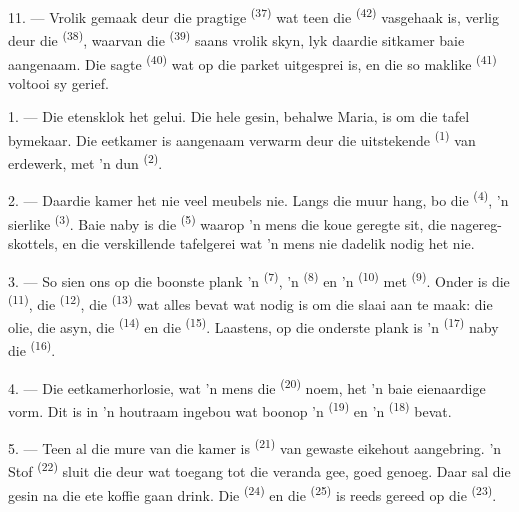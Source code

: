 11. --- Vrolik gemaak deur die pragtige  \textsuperscript{(37)} wat
teen die  \textsuperscript{(42)} vasgehaak is, verlig deur die
 \textsuperscript{(38)}, waarvan die  \textsuperscript{(39)} saans vrolik skyn, lyk daardie sitkamer baie aangenaam. Die
sagte  \textsuperscript{(40)} wat op die parket uitgesprei is, en die so
maklike  \textsuperscript{(41)} voltooi sy gerief.

\VUsaut{3.6mm}
\VUsaut{3.0mm}

1. --- Die etensklok het gelui. Die hele gesin, behalwe Maria, is om die tafel
bymekaar. Die eetkamer is aangenaam verwarm deur die uitstekende 
\textsuperscript{(1)} van erdewerk, met 'n dun  \textsuperscript{(2)}.

2. --- Daardie kamer het nie veel meubels nie. Langs die muur hang, bo die
 \textsuperscript{(4)}, 'n sierlike 
\textsuperscript{(3)}. Baie naby is die  \textsuperscript{(5)} waarop 'n
mens die koue geregte sit, die nagereg-skottels, en die verskillende tafelgerei wat 'n
mens nie dadelik nodig het nie.

3. --- So sien ons op die boonste plank 'n 
\textsuperscript{(7)}, 'n  \textsuperscript{(8)} en 'n 
\textsuperscript{(10)} met  \textsuperscript{(9)}. Onder is die
 \textsuperscript{(11)}, die  \textsuperscript{(12)}, die
 \textsuperscript{(13)} wat alles bevat wat nodig is om die
slaai aan te maak: die olie, die asyn, die  \textsuperscript{(14)} en die
 \textsuperscript{(15)}. Laastens, op die onderste plank is 'n
 \textsuperscript{(17)} naby die 
\textsuperscript{(16)}.

4. --- Die eetkamerhorlosie, wat 'n mens die 
\textsuperscript{(20)} noem, het 'n baie eienaardige vorm. Dit is in 'n houtraam ingebou
wat boonop 'n  \textsuperscript{(19)} en 'n 
\textsuperscript{(18)} bevat.

\VUsaut{4.6mm}
\VUsaut{3.0mm}

5. --- Teen al die mure van die kamer is  \textsuperscript{(21)} van
gewaste eikehout aangebring. 'n Stof  \textsuperscript{(22)} sluit
die deur wat toegang tot die veranda gee, goed genoeg. Daar sal die gesin na die ete
koffie gaan drink. Die  \textsuperscript{(24)} en die 
\textsuperscript{(25)} is reeds gereed op die 
\textsuperscript{(23)}.

